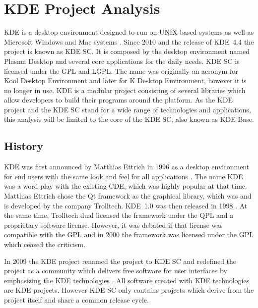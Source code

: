 \section{KDE Project Analysis} %


\noindent KDE is a desktop environment designed to run on UNIX based systems as
well as Microsoft Windows and Mac  systems
\cite{KDEPress,KDEAbout}. Since 2010 and the release of KDE~4.4 the project is
known as \ac{KDE SC}. It is composed by the desktop environment named Plasma
Desktop and several core applications for the daily needs. \ac{KDE SC} is
licensed under the \ac{GPL} and \ac{LGPL}. The name was originally an acronym
for Kool Desktop Environment and later for K Desktop Environment, however it is
no longer in use. KDE is a modular project consisting of several libraries
which allow developers to build their programs around the platform. As the KDE
project and the \ac{KDE SC} stand for a wide range of technologies and
applications, this analysis will be limited to the core of the \ac{KDE SC},
also known as KDE Base.

\subsection{History} %

KDE was first announced by Matthias Ettrich in 1996 as a desktop environment
for end users with the same look and feel for all applications
\cite{KDEAnnouncement}. The name KDE was a word play with the existing
\ac{CDE}, which was highly popular at that time. Matthias Ettrich chose the Qt
framework as the graphical library, which was and is developed by the company
Trolltech. KDE~1.0 was then released in 1998 \cite{KDEHistory}. At the same
time, Trolltech dual licensed the framework under the \ac{QPL} and a
proprietary software license. However, it was debated if that license was
compatible with the \ac{GPL} and in 2000 the framework was licensed under the
\ac{GPL} which ceased the criticism.

In 2009 the KDE project renamed the project to \ac{KDE SC} and redefined the
project as a community which delivers free software for user interfaces by
emphasizing the KDE technologies \cite{KDESC}. All software created with KDE
technologies are KDE projects. However \ac{KDE SC} only contains projects which
derive from the project itself and share a common release cycle.

